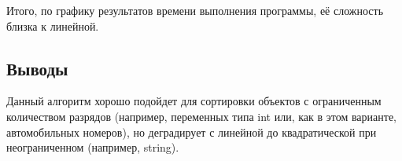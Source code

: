 \documentclass[12pt]{article}
\begin{document}
Итого, по графику результатов времени выполнения программы, её сложность близка к линейной.
\\




\subsection*{Выводы}

Данный алгоритм хорошо подойдет для сортировки объектов с ограниченным количеством разрядов (например, переменных типа int или, как в этом варианте, автомобильных номеров), но деградирует с линейной до квадратической при неограниченном (например, string).


\end{document}
